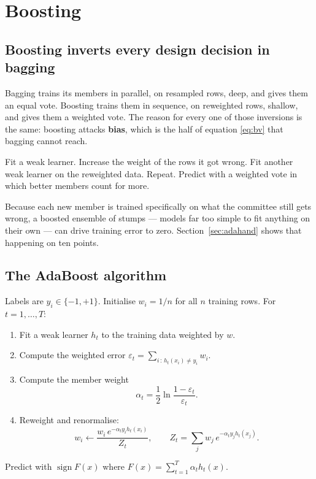 \documentclass[11pt]{article}
\begin{document}
\section{Boosting}
\label{sec:boost}

\subsection{Boosting inverts every design decision in bagging}

Bagging trains its members in parallel, on resampled rows, deep, and gives
them an equal vote. Boosting trains them in sequence, on reweighted rows,
shallow, and gives them a weighted vote. The reason for every one of those
inversions is the same: boosting attacks \textbf{bias}, which is the half of
equation \eqref{eq:bv} that bagging cannot reach.

\begin{keyidea}[Boosting]
Fit a weak learner. Increase the weight of the rows it got wrong. Fit another
weak learner on the reweighted data. Repeat. Predict with a weighted vote in
which better members count for more.
\end{keyidea}

Because each new member is trained specifically on what the committee still
gets wrong, a boosted ensemble of stumps --- models far too simple to fit
anything on their own --- can drive training error to zero. Section~\ref{sec:adahand}
shows that happening on ten points.

\subsection{The AdaBoost algorithm}

Labels are $y_i \in \{-1, +1\}$. Initialise $w_i = 1/n$ for all $n$ training
rows. For $t = 1, \dots, T$:

\begin{enumerate}[leftmargin=*]
  \item Fit a weak learner $h_t$ to the training data weighted by $w$.
  \item Compute the weighted error
    $\displaystyle \varepsilon_t = \sum_{i \,:\, h_t(x_i) \neq y_i} w_i$.
  \item Compute the member weight
    \begin{equation}
      \alpha_t = \frac{1}{2}\ln\frac{1 - \varepsilon_t}{\varepsilon_t}.
      \label{eq:alpha}
    \end{equation}
  \item Reweight and renormalise:
    \begin{equation}
      w_i \leftarrow \frac{w_i\,e^{-\alpha_t y_i h_t(x_i)}}{Z_t},
      \qquad
      Z_t = \sum_j w_j\,e^{-\alpha_t y_j h_t(x_j)}.
      \label{eq:reweight}
    \end{equation}
\end{enumerate}
Predict with $\operatorname{sign} F(x)$ where
$F(x) = \sum_{t=1}^{T}\alpha_t h_t(x)$.
\end{document}
